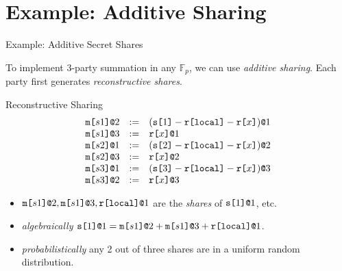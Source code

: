\documentclass{beamer}
\begin{document}
\section{Example: Additive Sharing}
\begin{frame}{Example: Additive Secret Shares}

  To implement 3-party summation in any $\mathbb{F}_p$, we can use \emph{additive sharing}.
  Each party first generates \emph{reconstructive shares}.
  
  \begin{block}{Reconstructive Sharing}
    $$
    \begin{array}{lll}
      \texttt{m[}s1\texttt{]}\texttt{@}2 &:=& (\texttt{s[}1\texttt{]} - \texttt{r[}\mathtt{local}\texttt{]} - \texttt{r[}x\texttt{]})\texttt{@}1 \\ 
      \texttt{m[}s1\texttt{]}\texttt{@}3 &:=& \texttt{r[}x\texttt{]}\texttt{@}1 \\ 
      \texttt{m[}s2\texttt{]}\texttt{@}1 &:=& (\texttt{s[}2\texttt{]} - \texttt{r[}\mathtt{local}\texttt{]} - \texttt{r[}x\texttt{]})\texttt{@}2 \\ 
      \texttt{m[}s2\texttt{]}\texttt{@}3 &:=& \texttt{r[}x\texttt{]}\texttt{@}2 \\ 
      \texttt{m[}s3\texttt{]}\texttt{@}1 &:=& (\texttt{s[}3\texttt{]} - \texttt{r[}\mathtt{local}\texttt{]} - \texttt{r[}x\texttt{]})\texttt{@}3 \\ 
      \texttt{m[}s3\texttt{]}\texttt{@}2 &:=& \texttt{r[}x\texttt{]}\texttt{@}3
    \end{array}
    $$
  \end{block}
  \begin{itemize}
  \item $\texttt{m[}s1\texttt{]}\texttt{@}2, \texttt{m[}s1\texttt{]}\texttt{@}3, \texttt{r[}\mathtt{local}\texttt{]}\texttt{@}1$ are the \emph{shares} of $\texttt{s[}1\texttt{]}\texttt{@}1$,
    etc.
  \item \emph{algebraically} $\texttt{s[}1\texttt{]}\texttt{@}1 = \texttt{m[}s1\texttt{]}\texttt{@}2 + \texttt{m[}s1\texttt{]}\texttt{@}3 + \texttt{r[}\mathtt{local}\texttt{]}\texttt{@}1$.
  \item \emph{probabilistically} any 2 out of three shares are in a uniform random distribution.
  \end{itemize}
  
\end{frame}
\end{document}
